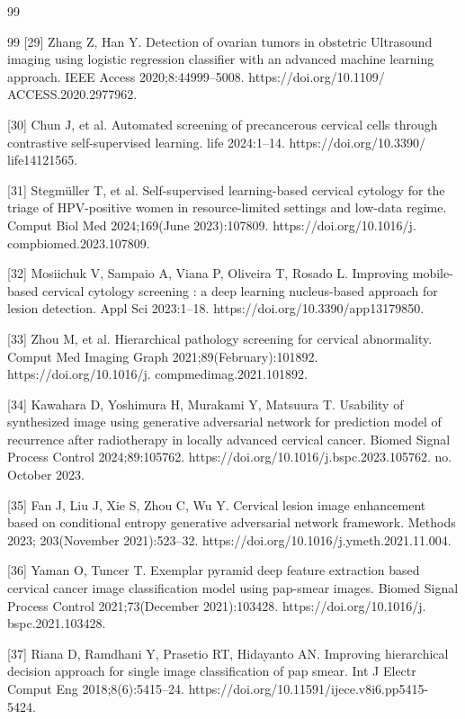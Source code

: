 \documentclass{svjour3}
\begin{document}
\begin{thebibliography}{99}
\begin{thebibliography}{99}
 [29] Zhang Z, Han Y. Detection of ovarian tumors in obstetric Ultrasound imaging using logistic regression classifier with an advanced machine learning approach. IEEE Access 2020;8:44999–5008. https://doi.org/10.1109/ ACCESS.2020.2977962.

 [30] Chun J, et al. Automated screening of precancerous cervical cells through contrastive self-supervised learning. life 2024:1–14. https://doi.org/10.3390/ life14121565.

 [31] Stegmüller T, et al. Self-supervised learning-based cervical cytology for the triage of HPV-positive women in resource-limited settings and low-data regime. Comput Biol Med 2024;169(June 2023):107809. https://doi.org/10.1016/j. compbiomed.2023.107809.

 [32] Mosiichuk V, Sampaio A, Viana P, Oliveira T, Rosado L. Improving mobile-based cervical cytology screening : a deep learning nucleus-based approach for lesion detection. Appl Sci 2023:1–18. https://doi.org/10.3390/app13179850.

 [33] Zhou M, et al. Hierarchical pathology screening for cervical abnormality. Comput Med Imaging Graph 2021;89(February):101892. https://doi.org/10.1016/j. compmedimag.2021.101892.

 [34] Kawahara D, Yoshimura H, Murakami Y, Matsuura T. Usability of synthesized image using generative adversarial network for prediction model of recurrence after radiotherapy in locally advanced cervical cancer. Biomed Signal Process Control 2024;89:105762. https://doi.org/10.1016/j.bspc.2023.105762. no. October 2023.

 [35] Fan J, Liu J, Xie S, Zhou C, Wu Y. Cervical lesion image enhancement based on conditional entropy generative adversarial network framework. Methods 2023; 203(November 2021):523–32. https://doi.org/10.1016/j.ymeth.2021.11.004.

 [36] Yaman O, Tuncer T. Exemplar pyramid deep feature extraction based cervical cancer image classification model using pap-smear images. Biomed Signal Process Control 2021;73(December 2021):103428. https://doi.org/10.1016/j. bspc.2021.103428.

 [37] Riana D, Ramdhani Y, Prasetio RT, Hidayanto AN. Improving hierarchical decision approach for single image classification of pap smear. Int J Electr Comput Eng 2018;8(6):5415–24. https://doi.org/10.11591/ijece.v8i6.pp5415- 5424.


\end{thebibliography}
\end{thebibliography}
\end{document}
